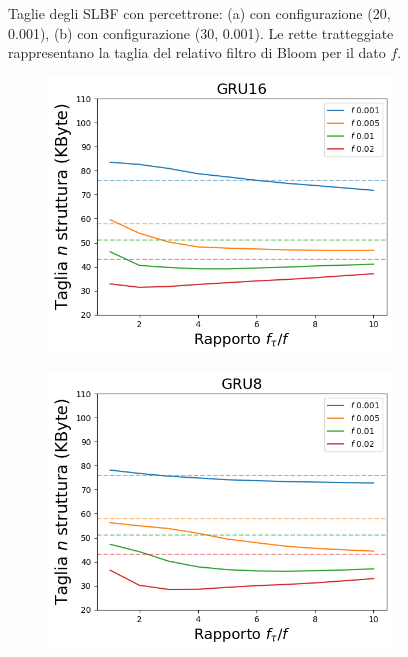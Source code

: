 \documentclass[../../main.tex]{subfiles}
\begin{document}
\begin{figure}[H]
\begin{subfigure}[b]{0.49\textwidth}
            \caption{}
            \label{fig:SLBFTagliaPercettrone30}
        \end{subfigure}
        \caption{Taglie degli SLBF con percettrone: (a) con configurazione (20, 0.001), (b) con configurazione (30, 0.001). Le rette tratteggiate rappresentano la taglia del relativo filtro di Bloom per il dato $f$.}
        \label{fig:tagliePercettroniSLBF}
    \end{figure}

    \begin{figure}[H]
        \centering
        \begin{subfigure}[b]{0.49\textwidth}
            \centering
            \includegraphics[width = \textwidth]{immagini/7/SLBF/GRU16_Taglia.png}
            \caption{}
            \label{fig:SLBFTagliaGRU16}
        \end{subfigure}
        \begin{subfigure}[b]{0.49\textwidth}
            \centering
            \includegraphics[width = \textwidth]{immagini/7/SLBF/GRU8_Taglia.png}

\end{subfigure}
\end{figure}
\end{document}
